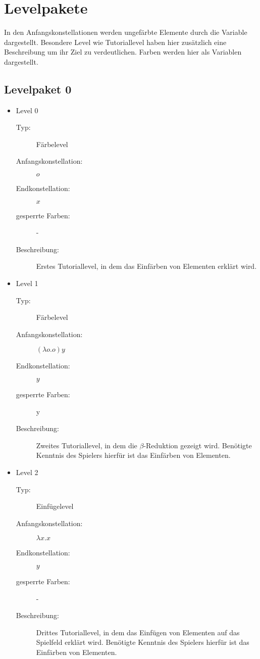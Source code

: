 \chapter{Levelpakete}
In den Anfangskonstellationen werden ungefärbte Elemente durch die Variable  dargestellt. 
Besondere Level wie Tutoriallevel haben hier zusätzlich eine Beschreibung um ihr Ziel zu verdeutlichen.
Farben werden hier als Variablen dargestellt.

\section{Levelpaket 0}
\begin{itemize}
	\item{Level 0} 
		\begin{description}
			\item[Typ:] Färbelevel 
			\item[Anfangskonstellation:] \( o\)
			\item[Endkonstellation:] \( x\)
			\item[gesperrte Farben:] -  
			\item[Beschreibung:] Erstes Tutoriallevel, in dem das Einfärben von Elementen erklärt wird.
		\end{description}

	\item{Level 1} 
		\begin{description}
			\item[Typ:] Färbelevel 
			\item[Anfangskonstellation:] \((\lambda o . o ) y\)   
			\item[Endkonstellation:] \(y\) 
			\item[gesperrte Farben:] y 
			\item[Beschreibung:] Zweites Tutoriallevel, in dem die \(\beta\)-Reduktion gezeigt wird.
								Benötigte Kenntnis des Spielers hierfür ist das Einfärben von Elementen. 
		\end{description}

	\item{Level 2} 
		\begin{description}
			\item[Typ:] Einfügelevel 
			\item[Anfangskonstellation:] \(\lambda x . x \)   
			\item[Endkonstellation:] \(y\)
			\item[gesperrte Farben:] -  
			\item[Beschreibung:] Drittes Tutoriallevel, in dem das Einfügen von Elementen auf das Spielfeld erklärt wird.
								Benötigte Kenntnis des Spielers hierfür ist das Einfärben von Elementen. 
		\end{description}


\end{itemize}
